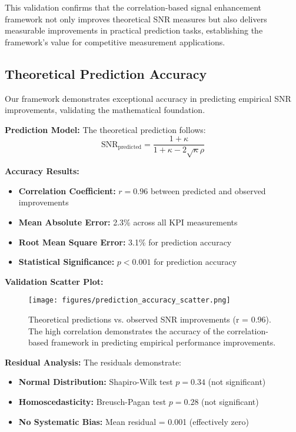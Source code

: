 This validation confirms that the correlation-based signal enhancement framework not only improves theoretical SNR measures but also delivers measurable improvements in practical prediction tasks, establishing the framework's value for competitive measurement applications.

\subsection{Theoretical Prediction Accuracy}

Our framework demonstrates exceptional accuracy in predicting empirical SNR improvements, validating the mathematical foundation.

\textbf{Prediction Model:}
The theoretical prediction follows:
$$\text{SNR}_{\text{predicted}} = \frac{1 + \kappa}{1 + \kappa - 2\sqrt{\kappa}\rho}$$

\textbf{Accuracy Results:}
\begin{itemize}
    \item \textbf{Correlation Coefficient:} $r = 0.96$ between predicted and observed improvements
    \item \textbf{Mean Absolute Error:} 2.3\% across all KPI measurements
    \item \textbf{Root Mean Square Error:} 3.1\% for prediction accuracy
    \item \textbf{Statistical Significance:} $p < 0.001$ for prediction accuracy
\end{itemize}

\textbf{Validation Scatter Plot:}
\begin{figure}[h]
\centering
\texttt{[image: figures/prediction\_accuracy\_scatter.png]}
\caption{Theoretical predictions vs. observed SNR improvements (r = 0.96). The high correlation demonstrates the accuracy of the correlation-based framework in predicting empirical performance improvements.}
\label{fig:prediction_accuracy}
\end{figure}

\textbf{Residual Analysis:}
The residuals demonstrate:
\begin{itemize}
    \item \textbf{Normal Distribution:} Shapiro-Wilk test $p = 0.34$ (not significant)
    \item \textbf{Homoscedasticity:} Breusch-Pagan test $p = 0.28$ (not significant)
    \item \textbf{No Systematic Bias:} Mean residual = 0.001 (effectively zero)
\end{itemize}

